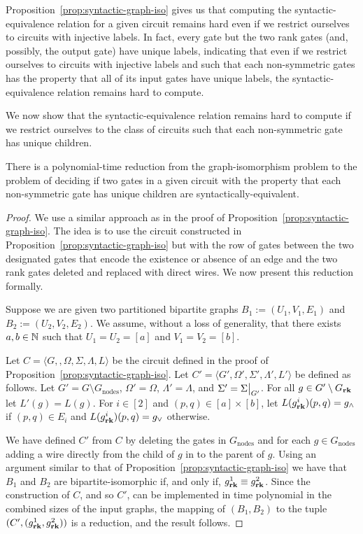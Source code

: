 \documentclass[../paper.tex]{subfiles}
\begin{document}
Proposition~\ref{prop:syntactic-graph-iso} gives us that computing the
syntactic-equivalence relation for a given circuit remains hard even if we
restrict ourselves to circuits with injective labels. In fact, every gate but
the two rank gates (and, possibly, the output gate) have unique labels,
indicating that even if we restrict ourselves to circuits with injective labels
and such that each non-symmetric gates has the property that all of its input
gates have unique labels, the syntactic-equivalence relation remains hard to
compute.

We now show that the syntactic-equivalence relation remains hard to compute if
we restrict ourselves to the class of circuits such that each non-symmetric gate
has unique children.

\begin{lem}
  There is a polynomial-time reduction from the graph-isomorphism problem to the
  problem of deciding if two gates in a given circuit with the property that
  each non-symmetric gate has unique children are syntactically-equivalent.
  \label{lem:syntactic-equivalence-unique-gates-hard}
\end{lem}
\begin{proof}
  We use a similar approach as in the proof of
  Proposition~\ref{prop:syntactic-graph-iso}. The idea is to use the circuit
  constructed in Proposition~\ref{prop:syntactic-graph-iso} but with the row of
  gates between the two designated gates that encode the existence or absence of
  an edge and the two rank gates deleted and replaced with direct wires. We now
  present this reduction formally.
  
  Suppose we are given two partitioned bipartite graphs $B_1 := (U_1, V_1, E_1)$
  and $B_2 := (U_2, V_2, E_2)$. We assume, without a loss of generality, that
  there exists $a, b \in \mathbb{N}$ such that $U_1 = U_2 = [a]$ and $V_1 = V_2 =
  [b]$.

  Let $C = \langle G, , \Omega, \Sigma, \Lambda, L \rangle$ be the circuit
  defined in the proof of Proposition~\ref{prop:syntactic-graph-iso}. Let $C' =
  \langle G', \Omega', \Sigma', \Lambda', L'\rangle$ be defined as follows. Let
  $G' = G \setminus G_{\text{nodes}}$, $\Omega' = \Omega$, $\Lambda' = \Lambda$,
  and $\Sigma' = \restr{\Sigma}{G'}$. For all $g \in G' \setminus G_{\text{\textbf{rk}}}$ let
  $L'(g) = L(g)$. For $i \in [2]$ and $(p,q) \in [a] \times [b]$, let
  $L(g^i_{\text{\textbf{rk}}})(p,q) = g_{\land}$ if $(p,q) \in E_i$ and $L(g^i_{\text{\textbf{rk}}})(p,q)
  = g_{\lor}$ otherwise.

  We have defined $C'$ from $C$ by deleting the gates in $G_{\text{nodes}}$ and
  for each $g \in G_{\text{nodes}}$ adding a wire directly from the child of $g$
  in to the parent of $g$. Using an argument similar to that of
  Proposition~\ref{prop:syntactic-graph-iso} we have that $B_1$ and $B_2$ are
  bipartite-isomorphic if, and only if, $g^1_{\text{\textbf{rk}}} \equiv g^2_{\text{\textbf{rk}}}$. Since
  the construction of $C$, and so $C'$, can be implemented in time polynomial in
  the combined sizes of the input graphs, the mapping of $(B_1, B_2)$ to the
  tuple $(C', (g^1_{\text{\textbf{rk}}}, g^2_{\text{\textbf{rk}}}))$ is a reduction, and the result
  follows.
\end{proof}
\end{document}
